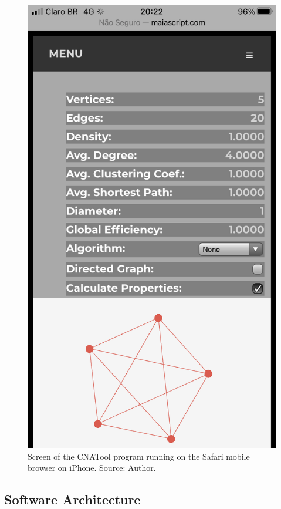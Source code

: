 \documentclass[preprint,12pt, a4paper]{elsarticle}
\begin{document}
\begin{figure}[!htbp]
    \begin{center}
        \includegraphics[scale=0.2]{images/iphone.png}
    \end{center}
    \caption{Screen of the CNATool program running on the Safari mobile browser on iPhone. Source: Author.}
    \label{fig:iphone}
\end{figure}

\subsection{Software Architecture}
\label{architecture}
\end{document}
